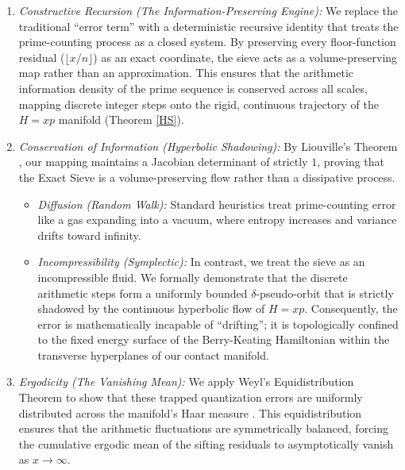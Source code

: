 \documentclass[sn-mathphys-num, pdflatex]{sn-jnl}
\begin{document}
\begin{enumerate}
    \item \textit{Constructive Recursion (The Information-Preserving Engine):} We replace the traditional ``error term'' with a deterministic recursive identity that treats the prime-counting process as a closed system. By preserving every floor-function residual ($\lfloor x/n \rfloor$) as an exact coordinate, the sieve acts as a volume-preserving map rather than an approximation. This ensures that the arithmetic information density of the prime sequence is conserved across all scales, mapping discrete integer steps onto the rigid, continuous trajectory of the $H=xp$ manifold (Theorem \ref{HS}).

    \item \textit{Conservation of Information (Hyperbolic Shadowing):} By Liouville's Theorem \cite{arnold1989}, our mapping maintains a Jacobian determinant of strictly $1$, proving that the Exact Sieve is a volume-preserving flow rather than a dissipative process.
    \begin{itemize}
        \item \textit{Diffusion (Random Walk):} Standard heuristics treat prime-counting error like a gas expanding into a vacuum, where entropy increases and variance drifts toward infinity.
        \item \textit{Incompressibility (Symplectic):} In contrast, we treat the sieve as an incompressible fluid. We formally demonstrate that the discrete arithmetic steps form a uniformly bounded $\delta$-pseudo-orbit that is strictly shadowed by the continuous hyperbolic flow of $H=xp$. Consequently, the error is mathematically incapable of ``drifting''; it is topologically confined to the fixed energy surface of the Berry-Keating Hamiltonian \cite{berry1999riemann} within the transverse hyperplanes of our contact manifold.
    \end{itemize}

    \item \textit{Ergodicity (The Vanishing Mean):} We apply Weyl's Equidistribution Theorem \cite{weyl} to show that these trapped quantization errors are uniformly distributed across the manifold's Haar measure \cite{halmos1950measure}. This equidistribution ensures that the arithmetic fluctuations are symmetrically balanced, forcing the cumulative ergodic mean of the sifting residuals to asymptotically vanish as $x \to \infty$.


\end{enumerate}
\end{document}
